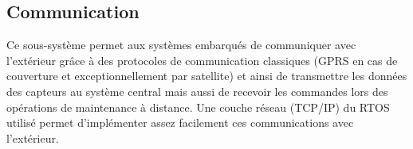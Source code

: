        \subsection{Communication}
       Ce sous-système permet aux systèmes embarqués de communiquer avec l'extérieur grâce à des protocoles de communication classiques (GPRS en cas de couverture et exceptionnellement par satellite) et ainsi de transmettre les données des capteurs au système central mais aussi de recevoir les commandes lors des opérations de maintenance à distance. Une couche réseau (TCP/IP) du RTOS utilisé permet d'implémenter assez facilement ces communications avec l'extérieur.